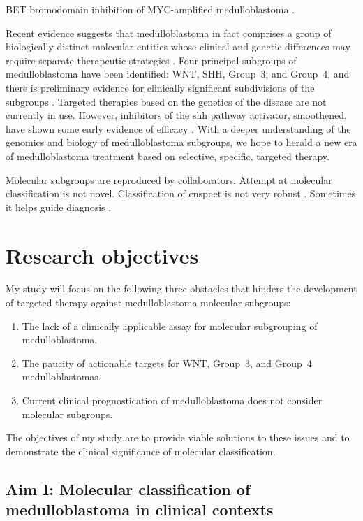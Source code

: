 BET bromodomain inhibition of MYC-amplified medulloblastoma . 


Recent evidence suggests that medulloblastoma in fact comprises a group of biologically distinct molecular entities whose clinical and genetic differences may require separate therapeutic strategies . Four principal subgroups of medulloblastoma have been identified: WNT, SHH, Group~3, and Group~4, and there is preliminary evidence for clinically significant subdivisions of the subgroups . Targeted therapies based on the genetics of the disease are not currently in use. However, inhibitors of the \gls{shh} pathway activator, smoothened, have shown some early evidence of efficacy . With a deeper understanding of the genomics and biology of medulloblastoma subgroups, we hope to herald a new era of medulloblastoma treatment based on selective, specific, targeted therapy.

Molecular subgroups are reproduced by collaborators.
Attempt at molecular classification is not novel. Classification of \gls{cnspnet} is not very robust .
Sometimes it helps guide diagnosis .

\section{Research objectives}

My study will focus on the following three obstacles that hinders the development of targeted therapy against medulloblastoma molecular subgroups:

\begin{enumerate}
	\item The lack of a clinically applicable assay for molecular subgrouping of medulloblastoma.
	\item The paucity of actionable targets for WNT, Group~3, and Group~4 medulloblastomas.
	\item Current clinical prognostication of medulloblastoma does not consider molecular subgroups.
\end{enumerate}

The objectives of my study are to provide viable solutions to these issues and to demonstrate the clinical significance of molecular classification.


\subsection*{Aim I: Molecular classification of medulloblastoma in clinical contexts}

